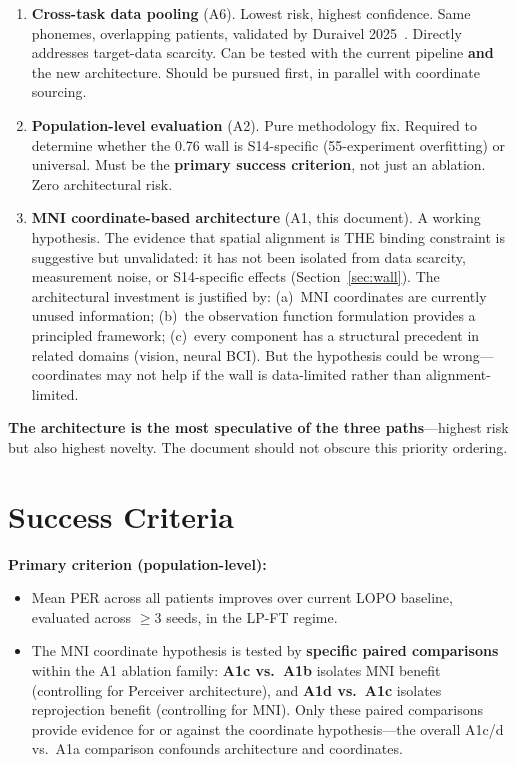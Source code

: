 \documentclass[11pt,letterpaper]{article}
\begin{document}
\begin{enumerate}[leftmargin=2em]
\item \textbf{Cross-task data pooling} (A6). Lowest risk, highest confidence. Same phonemes, overlapping patients, validated by Duraivel 2025~\cite{duraivel2025}. Directly addresses target-data scarcity. Can be tested with the current pipeline \textbf{and} the new architecture. Should be pursued first, in parallel with coordinate sourcing.

\item \textbf{Population-level evaluation} (A2). Pure methodology fix. Required to determine whether the 0.76 wall is S14-specific (55-experiment overfitting) or universal. Must be the \textbf{primary success criterion}, not just an ablation. Zero architectural risk.

\item \textbf{MNI coordinate-based architecture} (A1, this document). A working hypothesis. The evidence that spatial alignment is THE binding constraint is suggestive but unvalidated: it has not been isolated from data scarcity, measurement noise, or S14-specific effects (Section~\ref{sec:wall}). The architectural investment is justified by: (a)~MNI coordinates are currently unused information; (b)~the observation function formulation provides a principled framework; (c)~every component has a structural precedent in related domains (vision, neural BCI). But the hypothesis could be wrong---coordinates may not help if the wall is data-limited rather than alignment-limited.
\end{enumerate}

\textbf{The architecture is the most speculative of the three paths}---highest risk but also highest novelty. The document should not obscure this priority ordering.


\section{Success Criteria}\label{sec:success}

\textbf{Primary criterion (population-level):}
\begin{itemize}[leftmargin=2em]
\item Mean PER across all patients improves over current LOPO baseline, evaluated across ${\geq}3$ seeds, in the LP-FT regime.
\item The MNI coordinate hypothesis is tested by \textbf{specific paired comparisons} within the A1 ablation family: \textbf{A1c vs.\ A1b} isolates MNI benefit (controlling for Perceiver architecture), and \textbf{A1d vs.\ A1c} isolates reprojection benefit (controlling for MNI). Only these paired comparisons provide evidence for or against the coordinate hypothesis---the overall A1c/d vs.\ A1a comparison confounds architecture and coordinates.
\end{itemize}
\end{document}
